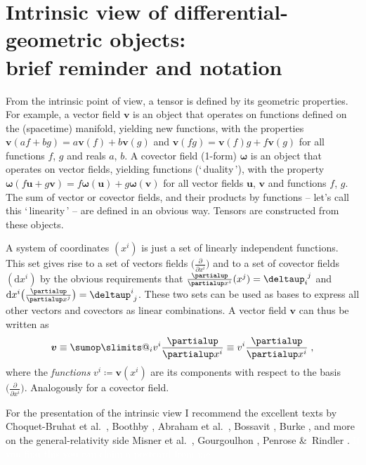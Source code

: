 \documentclass[\ifafour a4paper,12pt,\else a5paper,10pt,\fi%
onecolumn,oneside,article,%
british%
]{memoir}
\makeatletter
\newcommand*{\defquote}[1]{`\,#1\,'}
\theoremstyle{remark}
\theoremstyle{innote}
\def\sum{\DOTSI\sumop\slimits@}
\newcommand*{\citep}{\footcites}
\newcommand*{\citey}{\parencites*}%
\newcommand*{\amp}{\&}
\newcommand*{\de}{\partialup}%
\newcommand*{\delt}{\deltaup}%
\newcommand*{\di}{\mathrm{d}}%
\newcommand*{\defd}{\coloneqq}
\newcommand*{\dotv}{\mathord{\,\cdot\,}}%
\renewcommand*{\|}[1][]{\nonscript\,#1\vert\nonscript\;\mathopen{}}
\newcommand*{\chap}{ch.}%
\newcommand*{\etal}{{et al.}}
\newcommand*{\yom}{\bm{\omega}}
\newcommand*{\yv}{\bm{v}}
\newcommand*{\yu}{\bm{u}}
\renewcommand*{\i}{\indices}
\newcommand*{\dex}[1][i]{\frac{\de}{\de x^{#1}}}
\newcommand*{\dix}[1][i]{\di x^{#1}}
\makeatother
\begin{document}


\section{Intrinsic view of differential-geometric objects:\\ brief
  reminder and notation}
\label{sec:remined}


From the intrinsic point of view, a tensor is defined by its geometric
properties. For example, a vector field $\yv$ %
is an object that operates on functions defined on the (spacetime)
manifold, yielding new functions, with the properties
$\yv(af+bg)=a\yv(f)+b\yv(g)$ and $\yv(fg)=\yv(f)g+f\yv(g)$ for all
functions $f$, $g$ and reals $a$, $b$. A covector field (1-form) $\yom$ is
an object that operates on vector fields, yielding functions
(\defquote{duality}), with the property
$\yom(f\yu+g\yv)=f\yom(\yu)+g\yom(\yv)$ for all vector fields $\yu$, $\yv$
and functions $f$, $g$. The sum of vector or covector fields, and their
products by functions -- let's call this \defquote{linearity} -- are
defined in an obvious way. Tensors are constructed from these objects.

A system of coordinates $(x^{i})$ is just a set of linearly independent
functions. This set gives rise to a set of vectors fields
$\bigl(\dex\bigr)$ and to a set of covector fields $(\dix)$ by the obvious
requirements that $\dex(x^{j})=\delt\i{_{i}^{j}}$ and
$\dix\bigl(\dex[j]\bigr)=\delt\i{^{i}_{j}}$. These two sets can be used as bases
to express all other vectors and covectors as linear combinations. A
vector field $\yv$ can thus be written as
\begin{equation}
  \label{eq:vector_intrinsic}
  \yv \equiv \sum_{i}v^{i}\dex \equiv v^{i}\dex \;,
\end{equation}
where the \emph{functions} $v^{i}\defd \yv(x^{i})$ are its components with
respect to the basis $\bigl(\dex\bigr)$. Analogously for a covector field.

\medskip

For the presentation of the intrinsic view I recommend the excellent texts
by Choquet-Bruhat \etal\ \citey{choquetbruhatetal1977_r1996}, Boothby
\citey{boothby1975_r2003}, Abraham \etal\ \citey{abrahametal1983_r1988},
Bossavit \citey{bossavit1991}, Burke
\citey{burke1985_r1987}[\chap~2]{burke1980b}, and more on the
general-relativity side Misner \etal\
\citey[\chap~9]{misneretal1970_r1973}, Gourgoulhon
\citey[\chap~2]{gourgoulhon2007_r2012}, Penrose \amp\ Rindler
\citey[\chap~4]{penroseetal1984_r2003}. \textcolor{white}{If you find this
  you can claim a postcard from me.}
\end{document}
